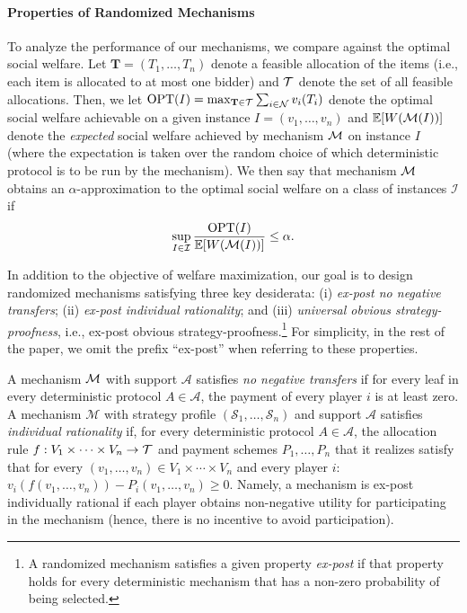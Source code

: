 \paragraph{Properties of Randomized Mechanisms}
To analyze the performance of our  mechanisms, we compare against the optimal social welfare.  Let $\mathbf{T} = (T_1, \dots ,T_n)$ denote a feasible allocation of the items (i.e., each item is allocated to at most one bidder) and $\mathcal{T}$ denote the set of all feasible allocations. 
 Then, we let $\text{OPT}(I) = \max_{\mathbf{T} \in \mathcal{T}}\sum_{i \in \mathcal{N}}{v_i(T_i)}$ denote the optimal social welfare achievable on a given instance $I=(v_1,\ldots,v_n)$ and $\mathbb{E}[W(\mathcal{M}(I))]$ denote the \emph{expected} social welfare achieved by mechanism $\mathcal{M}$ on instance $I$ (where the expectation is taken over the random choice of which deterministic protocol is to be run by the mechanism).  We then say that mechanism $\mathcal{M}$ obtains an $\alpha$-approximation to the optimal social welfare on a class of instances $\mathcal{I}$ if \[\sup_{I \in \mathcal{I}} \frac{\text{OPT}(I)}{\mathbb{E}[W(\mathcal{M}(I))]} \leq \alpha.\]

In addition to the objective of welfare maximization, our goal is to design randomized mechanisms  satisfying three key desiderata: (i) \emph{ex-post no negative transfers}; (ii)  \emph{ex-post individual rationality}; and (iii) \emph{universal obvious strategy-proofness}, i.e., ex-post obvious strategy-proofness.\footnote{
A randomized mechanism satisfies a given property \emph{ex-post} if that property holds for every deterministic mechanism that has a non-zero probability of being selected.} For simplicity, in the rest of the paper, we omit the prefix ``ex-post'' when referring to these properties. 

A mechanism $\mathcal{M}$ with support $\mathcal A$ satisfies \emph{no negative transfers} if for every leaf in every deterministic protocol $A\in \mathcal A$, the payment of every player $i$ is at least zero.
A mechanism $\mathcal M$ with strategy profile $(\mathcal S_1,\ldots, \mathcal S_n)$ and support $\mathcal A$ satisfies 
 \emph{individual rationality} if,
for every deterministic protocol $A\in \mathcal A$,
the allocation rule $f:V_1\times \cdots \times V_n\to \mathcal{T}$ and payment schemes $P_1,\ldots,P_n$  that it realizes satisfy that 
for every  $(v_1,\ldots,v_n)\in V_1\times \cdots \times V_n$ and every player $i$:
$
v_i(f(v_1,\ldots,v_n))-P_i(v_1,\ldots,v_n)\ge 0
$.
Namely, a mechanism is ex-post individually rational if each player obtains non-negative utility for participating in the mechanism (hence, there is no incentive to avoid participation).  

